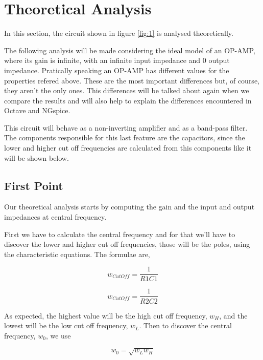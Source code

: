 \section{Theoretical Analysis}
\label{sec:theoretical}

\noindent \par In this section, the circuit shown in figure \ref{fig:1} is analysed theoretically.
\par The following analysis will be made considering the ideal model of an OP-AMP, where its gain is infinite, with an infinite input impedance and 0 output impedance. Pratically speaking an OP-AMP has different values for the properties refered above. These are the most important differences but, of course, they aren't the only ones. This differences will be talked about again when we compare the results and will also help to explain the differences encountered in Octave and NGspice.  
\par This circuit will behave as a non-inverting amplifier and as a band-pass filter. The components responsible for this last feature are the capacitors, since the lower and higher cut off frequencies are calculated from this components like it will be shown below.

\subsection{First Point}

\noindent \par Our theoretical analysis starts by computing the gain and the input and output impedances at central frequency.
\par First we have to calculate the central frequency and for that we'll have to discover the lower and higher cut off frequencies, those will be the poles, using the characteristic equations. The formulae are,

\begin{equation}
	w_{CutOff} = \frac{1}{R1C1}
\end{equation}

\begin{equation}
	w_{CutOff} = \frac{1}{R2C2}
\end{equation}

\par As expected, the highest value will be the high cut off frequency, $w_H$, and the lowest will be the low cut off frequency, $w_L$. Then to discover the central frequency, $w_0$, we use 

\begin{equation}
	w_{0} = \sqrt{w_L w_H}
\end{equation}

